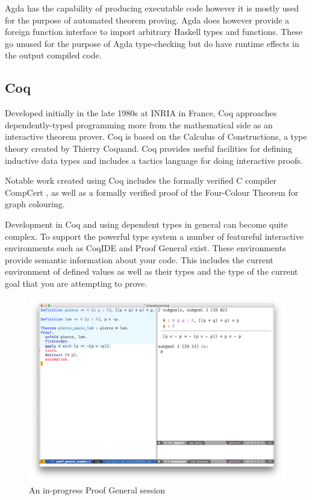 \documentclass[a4paper, notitlepage]{report}
\begin{document}
Agda has the capability of producing executable code however it is mostly used
for the purpose of automated theorem proving. Agda does however provide a
foreign function interface to import arbitrary Haskell types and functions.
These go unused for the purpose of Agda type-checking but do have runtime
effects in the output compiled code.

\subsection{Coq}
\label{sec:orgcb46e55}
Developed initially in the late 1980s at INRIA in France, Coq approaches
dependently-typed programming more from the mathematical side as an interactive
theorem prover. Coq is based on the Calculus of Constructions, a type theory
created by Thierry Coquand. Coq provides useful facilities for defining
inductive data types and includes a tactics language for doing interactive
proofs.

Notable work created using Coq includes the formally verified C compiler
CompCert \cite{compcert}, as well as a formally verified proof of the Four-Colour
Theorem \cite{gonthier_formal_2008} for graph colouring.

Development in Coq and using dependent types in general can become quite
complex. To support the powerful type system a number of featureful interactive
environments such as CoqIDE and Proof General \cite{proof_general} exist. These
environments provide semantic information about your code. This includes the
current environment of defined values as well as their types and the type of the
current goal that you are attempting to prove.

\begin{figure}[H]
\centering
\includegraphics[width=0.85\linewidth]{./fig/proof_general.png}
\caption{An in-progress Proof General session}
\end{figure}
\end{document}
